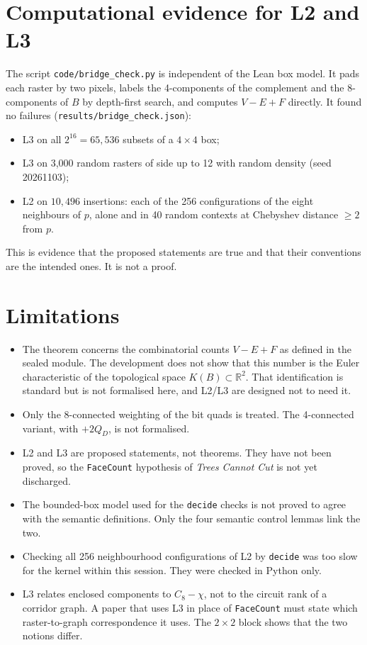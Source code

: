 \documentclass[11pt]{article}
\theoremstyle{definition}
\theoremstyle{remark}
\begin{document}
\section{Computational evidence for L2 and L3}\label{sec:evidence}

The script \texttt{code/bridge\_check.py} is independent of the Lean box model.
It pads each raster by two pixels, labels the 4-components of the complement and
the 8-components of $B$ by depth-first search, and computes $V-E+F$ directly.
It found no failures (\texttt{results/bridge\_check.json}):
\begin{itemize}
\item L3 on all $2^{16}=65{,}536$ subsets of a $4\times4$ box;
\item L3 on 3{,}000 random rasters of side up to 12 with random density (seed 20261103);
\item L2 on $10{,}496$ insertions: each of the 256 configurations of the eight
  neighbours of $p$, alone and in 40 random contexts at Chebyshev distance $\ge2$ from $p$.
\end{itemize}
This is evidence that the proposed statements are true and that their
conventions are the intended ones. It is not a proof.

\section{Limitations}

\begin{itemize}
\item The theorem concerns the combinatorial counts $V-E+F$ as defined in the
  sealed module. The development does not show that this number is the Euler
  characteristic of the topological space $K(B)\subset\mathbb{R}^2$. That
  identification is standard but is not formalised here, and L2/L3 are
  designed not to need it.
\item Only the 8-connected weighting of the bit quads is treated. The
  4-connected variant, with $+2Q_D$, is not formalised.
\item L2 and L3 are proposed statements, not theorems. They have not been
  proved, so the \texttt{FaceCount} hypothesis of \emph{Trees Cannot Cut} is
  not yet discharged.
\item The bounded-box model used for the \texttt{decide} checks is not proved
  to agree with the semantic definitions. Only the four semantic control lemmas
  link the two.
\item Checking all 256 neighbourhood configurations of L2 by \texttt{decide}
  was too slow for the kernel within this session. They were checked in Python
  only.
\item L3 relates enclosed components to $C_8-\chi$, not to the circuit rank of
  a corridor graph. A paper that uses L3 in place of \texttt{FaceCount} must
  state which raster-to-graph correspondence it uses. The $2\times2$ block
  shows that the two notions differ.
\end{itemize}
\end{document}
